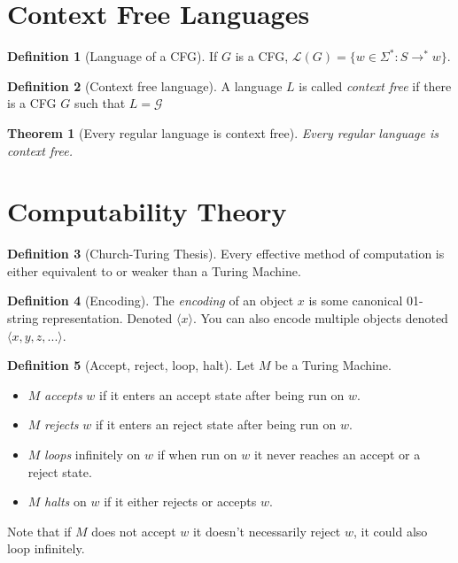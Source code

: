 \documentclass[12pt]{article}
\newtheorem{theorem}{Theorem}[section]
\theoremstyle{definition}
\newtheorem{definition}{Definition}[section]
\begin{document}
\section{Context Free Languages}
\begin{definition}[Language of a CFG]
    If $G$ is a CFG, $\mathcal{L}(G) = \{w \in \Sigma^* : S\to^* w\}$.
\end{definition}
\begin{definition}[Context free language]
    A language $L$ is called \emph{context free} if there is a CFG $G$ such that $L = \mathcal{G}$
\end{definition}
\begin{theorem}[Every regular language is context free]
Every regular language is context free.
\end{theorem}

\section{Computability Theory}
\begin{definition}[Church-Turing Thesis]
Every effective method of computation is either equivalent to or weaker than a Turing Machine.
\end{definition}

\begin{definition}[Encoding]
    The \emph{encoding} of an object $x$ is some canonical 01-string representation. Denoted $\langle x \rangle$. You can also encode multiple objects denoted $\langle x, y, z,... \rangle$.
\end{definition}

\begin{definition}[Accept, reject, loop, halt]
    Let $M$ be a Turing Machine.
    \begin{itemize}
        \item $M$ \emph{accepts} $w$ if it enters an accept state after being run on $w$.
        \item $M$ \emph{rejects} $w$ if it enters an reject state after being run on $w$.
        \item $M$ \emph{loops} infinitely on $w$ if when run on $w$ it never reaches an accept or a reject state.
        \item $M$ \emph{halts} on $w$ if it either rejects or accepts $w$.
    \end{itemize}
    Note that if $M$ does not accept $w$ it doesn't necessarily reject $w$, it could also loop infinitely.
\end{definition}
\end{document}

